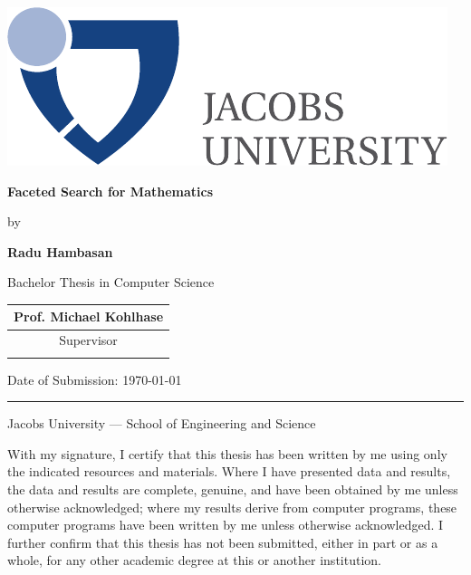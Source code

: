 \documentclass[a4paper,11pt,oneside]{article}
\newcommand{\myname}{Radu Hambasan}
\newcommand{\mytitle}{Faceted Search for Mathematics}
\newcommand{\mysupervisor}{Prof. Michael Kohlhase}
\begin{document}

\thispagestyle{empty}

\begin{flushright}
    \includegraphics[scale=0.7]{img/jub-logo}
\end{flushright}
\vspace{20mm}
\begin{center}
    \huge
    \textbf{\mytitle}
\end{center}
\vspace*{4mm}
\begin{center}
    \Large by
\end{center}
\vspace*{4mm}
\begin{center}
    \Large
    \textbf{\myname}
\end{center}
\vspace*{20mm}
\begin{center}
    \large
    Bachelor Thesis in Computer Science
\end{center}
\vfill
\begin{flushright}
    \large
    \begin{tabular}{c}
        \mysupervisor \\
        \hline
        Supervisor \\
        \\
    \end{tabular}
\end{flushright}
\vspace*{8mm}
\begin{flushleft}
    \large
    Date of Submission: \today \\
    \rule{\textwidth}{1pt}
\end{flushleft}
\begin{center}
    \Large Jacobs University --- School of Engineering and Science
\end{center}

\newpage
\thispagestyle{empty}

With my signature, I certify that this thesis has been written by me using
only the indicated resources and materials. Where I have presented data and
results, the data and results are complete, genuine, and have been obtained by
me unless otherwise acknowledged; where my results derive from computer
programs, these computer programs have been written by me unless otherwise
acknowledged. I further confirm that this thesis has not been submitted, either
in part or as a whole, for any other academic degree at this or another
institution.
\end{document}
